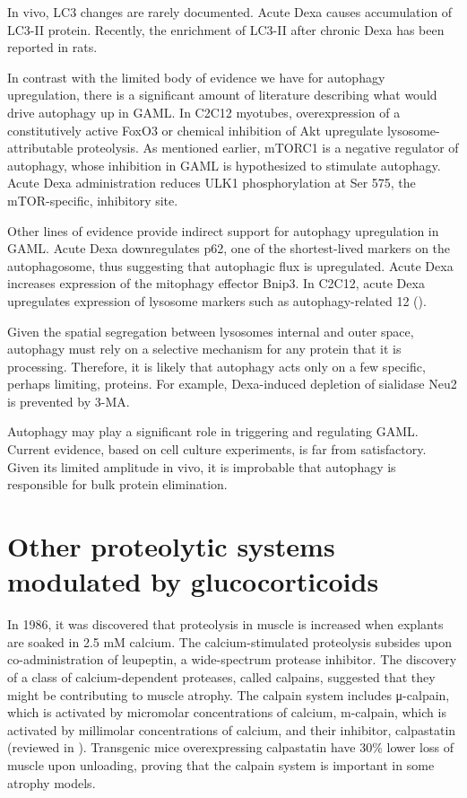 \documentclass[12pt,english]{report}\usepackage[]{graphicx}\usepackage[]{color}
\begin{document}
In vivo, LC3 changes are rarely documented. Acute Dexa causes accumulation
of LC3-II protein\citep{britto2014redd1}. Recently, the enrichment
of LC3-II after chronic Dexa has been reported in rats\citep{yamamoto2010branched-chain}.

In contrast with the limited body of evidence we have for autophagy
upregulation, there is a significant amount of literature describing
what would drive autophagy up in GAML. In C2C12 myotubes, overexpression
of a constitutively active FoxO3 or chemical inhibition of Akt upregulate
lysosome-attributable proteolysis\citep{zhao2007foxo3}. As mentioned
earlier, mTORC1 is a negative regulator of autophagy, whose inhibition
in GAML is hypothesized to stimulate autophagy. Acute Dexa administration
reduces ULK1 phosphorylation at Ser 575, the mTOR-specific, inhibitory
site\citep{britto2014redd1}.

Other lines of evidence provide indirect support for autophagy upregulation
in GAML. Acute Dexa downregulates p62, one of the shortest-lived markers
on the autophagosome, thus suggesting that autophagic flux is upregulated\citep{britto2014redd1}.
Acute Dexa increases expression of the mitophagy effector Bnip3\citep{britto2014redd1,giron2015beta-hydroxy-beta-methylbutyrate}.
In C2C12, acute Dexa upregulates expression of lysosome markers such
as autophagy-related 12 ()\citep{hudson2014mir-182}.

Given the spatial segregation between lysosomes internal and outer
space, autophagy must rely on a selective mechanism for any protein
that it is processing. Therefore, it is likely that autophagy acts
only on a few specific, perhaps limiting, proteins. For example, Dexa-induced
depletion of sialidase Neu2 is prevented by 3-MA\citep{rossi2009cytosolic}.

Autophagy may play a significant role in triggering and regulating
GAML. Current evidence, based on cell culture experiments, is far
from satisfactory. Given its limited amplitude in vivo, it is improbable
that autophagy is responsible for bulk protein elimination.


\section{Other proteolytic systems modulated by glucocorticoids}

In 1986, it was discovered that proteolysis in muscle is increased
when explants are soaked in 2.5 mM calcium\citep{rodemann1982stimulation,furuno1986activation}.
The calcium-stimulated proteolysis subsides upon co-administration
of leupeptin, a wide-spectrum protease inhibitor. The discovery of
a class of calcium-dependent proteases, called calpains, suggested
that they might be contributing to muscle atrophy. The calpain system
includes μ-calpain, which is activated by micromolar concentrations
of calcium, m-calpain, which is activated by millimolar concentrations
of calcium, and their inhibitor, calpastatin (reviewed in \citep{kachaeva2012various}).
Transgenic mice overexpressing calpastatin have 30\% lower loss of
muscle upon unloading\citep{tidball2002expression}, proving that
the calpain system is important in some atrophy models.
\end{document}
